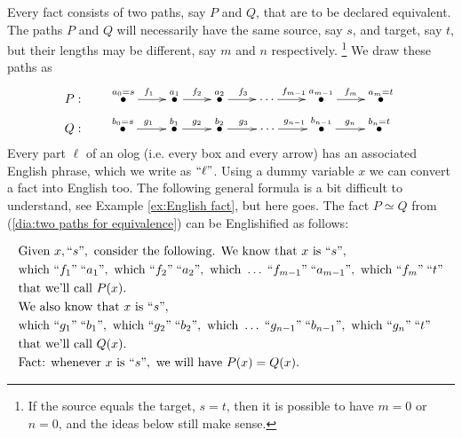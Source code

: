 \documentclass[a4paper]{book}
\def\tn{\textnormal}
\newcommand{\qtE}[1]{\tn{“}#1\tn{”}}
\def\hsp{\hspace{.3in}}
\newcommand{\LMO}[1]{\stackrel{#1}{\bullet}}
\theoremstyle{myth}
\begin{document}
\begin{russian}
Every fact consists of two paths, say $P$ and $Q$, that are to be declared equivalent. The paths $P$ and $Q$ will necessarily have the same source, say $s$, and target, say $t$, but their lengths may be different, say $m$ and $n$ respectively.%
\footnote{If the source equals the target, $s=t$, then it is possible  to have $m=0$ or $n=0$, and the ideas below still make sense.} 
We draw these paths as 
\begin{align}\label{dia:two paths for equivalence}
P:&\hsp\xymatrix@=22pt{\LMO{a_0=s}\ar[r]^{f_1}&\LMO{a_1}\ar[r]^{f_2}&\LMO{a_2}\ar[r]^{f_3}&\cdots\ar[r]^{f_{m-1}}&\LMO{a_{m-1}}\ar[r]^{f_m}&\LMO{a_m=t}}\\\nonumber
Q:&\hsp\xymatrix@=23pt{\LMO{b_0=s}\ar[r]^{g_1}&\LMO{b_1}\ar[r]^{g_2}&\LMO{b_2}\ar[r]^{g_3}&\cdots\ar[r]^{g_{n-1}}&\LMO{b_{n-1}}\ar[r]^{g_n}&\LMO{b_n=t}}
\end{align}
Every part $\ell$ of an olog (i.e. every box and every arrow) has an associated English phrase, which we write as $\qtE{\ell}$. Using a dummy variable $x$ we can convert a fact into English too. The following general formula is a bit difficult to understand, see Example \ref{ex:English fact}, but here goes. The fact $P\simeq Q$ from (\ref{dia:two paths for equivalence}) can be Englishified as follows:

\begin{align}\label{dia:Englishification}\index{Englishification}
&\tn{Given }x,\qtE{s},\tn{ consider the following. We know that }x\tn{ is }\qtE{s}, \\
\nonumber&\tn{which } \qtE{f_1}\;\qtE{a_1}, \tn{ which } \qtE{f_2}\;\qtE{a_2}, \tn{ which }\ldots \; \qtE{f_{m-1}}\;\qtE{a_{m-1}}, \tn{ which } \qtE{f_m}\;\qtE{t}\\
\nonumber&\tn{that we'll call } P(x).\\
\nonumber&\tn{We also know that }x\tn{ is } \qtE{s},\\
\nonumber&\tn{which } \qtE{g_1}\;\qtE{b_1}, \tn{ which }\qtE{g_2}\;\qtE{b_2}, \tn{ which }\ldots\;\qtE{g_{n-1}}\;\qtE{b_{n-1}}, \tn{ which } \qtE{g_n}\;\qtE{t}\\
\nonumber&\tn{that we'll call } Q(x).\\
\nonumber&\tn{Fact: whenever }x\tn{ is }\qtE{s},\tn{ we will have }P(x)=Q(x).
\end{align}


\end{russian}
\end{document}
